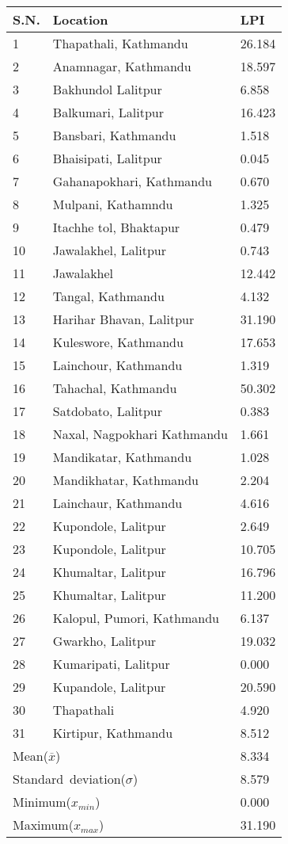 \begin{tabularx}{\textwidth}{ | l | p{} | X | }
\hline
 \textbf{S.N.} & \textbf{Location} & \textbf{LPI}\\
\hline
 1 & Thapathali, Kathmandu & 26.184 \\
 2 & Anamnagar, Kathmandu & 18.597 \\
 3 & Bakhundol Lalitpur & 6.858 \\
 4 & Balkumari, Lalitpur & 16.423 \\
 5 & Bansbari, Kathmandu & 1.518 \\
 6 & Bhaisipati, Lalitpur & 0.045 \\
 7 & Gahanapokhari, Kathmandu & 0.670 \\
 8 & Mulpani, Kathamndu  & 1.325 \\
 9 & Itachhe tol, Bhaktapur & 0.479 \\
 10 & Jawalakhel, Lalitpur  & 0.743 \\
 11 & Jawalakhel & 12.442 \\
 12 & Tangal, Kathmandu & 4.132 \\
 13 & Harihar Bhavan, Lalitpur & 31.190 \\
 14 & Kuleswore, Kathmandu & 17.653 \\
 15 & Lainchour, Kathmandu & 1.319 \\
 16 & Tahachal, Kathmandu & 50.302 \\
 17 & Satdobato, Lalitpur & 0.383 \\
 18 & Naxal, Nagpokhari Kathmandu  & 1.661 \\
 19 & Mandikatar, Kathmandu  & 1.028 \\
 20 & Mandikhatar, Kathmandu  & 2.204 \\
 21 & Lainchaur, Kathmandu  & 4.616 \\
 22 & Kupondole, Lalitpur & 2.649 \\
 23 & Kupondole, Lalitpur & 10.705 \\
 24 & Khumaltar, Lalitpur & 16.796 \\
 25 & Khumaltar, Lalitpur  & 11.200 \\
 26 & Kalopul, Pumori, Kathmandu & 6.137 \\
 27 & Gwarkho, Lalitpur & 19.032 \\
 28 & Kumaripati, Lalitpur & 0.000 \\
 29 & Kupandole, Lalitpur & 20.590 \\
 30 & Thapathali & 4.920 \\
 31 & Kirtipur, Kathmandu & 8.512 \\
\hline
\multicolumn{2}{|X|}{\mbox{Mean($\overline{x}$)}} & 8.334  \\
\multicolumn{2}{|X|}{\mbox{Standard deviation($\sigma$)}} & 8.579 \\
\multicolumn{2}{|X|}{\mbox{Minimum($x_{min}$)}} & 0.000 \\
\multicolumn{2}{|X|}{\mbox{Maximum($x_{max}$)}} & 31.190 \\
\hline
\end{tabularx}
